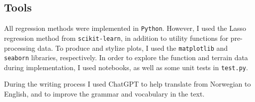 \subsection{Tools}\label{ssec:tools}
All regression methods were implemented in \verb|Python|. However, I used the Lasso regression method from \verb|scikit-learn|, in addition to utility functions for pre-processing data. To produce and stylize plots, I used the \verb|matplotlib| and \verb|seaborn| libraries, respectively. In order to explore the function and terrain data during implementation, I used notebooks, as well as some unit tests in \verb|test.py|. 

During the writing process I used ChatGPT to help translate from Norwegian to English, and to improve the grammar and vocabulary in the text.